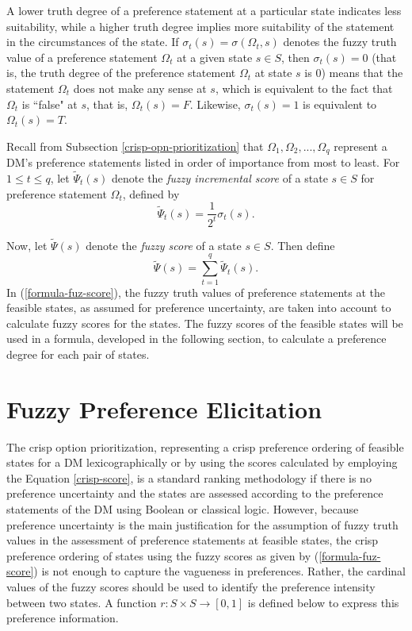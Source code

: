 A lower truth degree of a preference statement at a particular state indicates less suitability, while a higher truth degree implies more suitability of the statement in the circumstances of the state. If $\sigma_t(s)=\sigma(\Omega_t, s)$ denotes the fuzzy truth value of a preference statement $\Omega_t$ at a given state $s \in S$, then $\sigma_t(s)=0$ (that is, the truth degree of the preference statement $\Omega_t$ at state $s$ is $0$) means that the statement $\Omega_t$ does not make any sense at $s$, which is equivalent to the fact that $\Omega_t$ is ``false" at $s$, that is, $\Omega_t(s)=F$. Likewise, $\sigma_t(s)=1$ is equivalent to $\Omega_t(s)=T$.

Recall from Subsection \ref{crisp-opn-prioritization} that $\Omega_1, \Omega_2, ..., \Omega_q$ represent a DM's preference statements listed in order of importance from most to least. For $1\leq t\leq q$, let $\widetilde{\Psi}_t(s)$ denote the \emph{fuzzy incremental score} of a state $s \in S$ for preference statement $\Omega_t$, defined by
\begin{equation}\label{formula-fuz-incr-score}
\widetilde{\Psi}_t(s)=\frac{1}{2^t}\sigma_t(s).
\end{equation}

\noindent Now, let $\widetilde{\Psi}(s)$ denote the \emph{fuzzy score} of a state $s\in S$. Then define
\begin{equation}\label{formula-fuz-score}
\widetilde{\Psi}(s)=\displaystyle\sum\limits_{t=1}^q \widetilde{\Psi}_t(s).
\end{equation}
\noindent In (\ref{formula-fuz-score}), the fuzzy truth values of preference statements at the feasible states, as assumed for preference uncertainty, are taken into account to calculate fuzzy scores for the states. The fuzzy scores of the feasible states will be used in a formula, developed in the following section, to calculate a preference degree for each pair of states.

\section{Fuzzy Preference Elicitation}\label{sec-fpe}

The crisp option prioritization, representing a crisp preference ordering of feasible states for a DM lexicographically or by using the scores calculated by employing the Equation \ref{crisp-score}, is a standard ranking methodology if there is no preference uncertainty and the states are assessed according to the preference statements of the DM using Boolean or classical logic. However, because preference uncertainty is the main justification for the assumption of fuzzy truth values in the assessment of preference statements at feasible states, the crisp preference ordering of states using the fuzzy scores as given by (\ref{formula-fuz-score}) is not enough to capture the vagueness in preferences. Rather, the cardinal values of the fuzzy scores should be used to identify the preference intensity between two states. A function $r : S \times S \longrightarrow [0, 1]$ is defined below to express this preference information.

